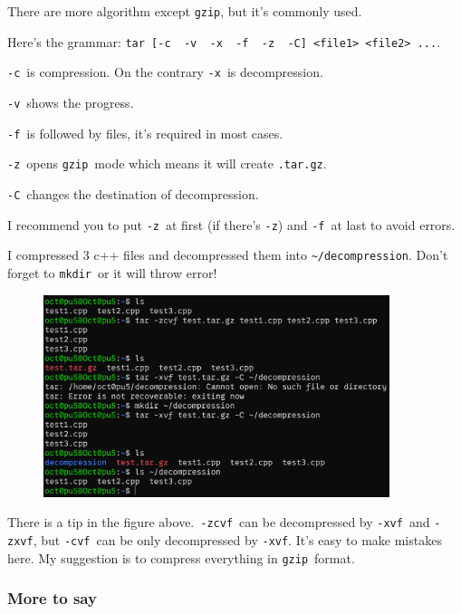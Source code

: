 \documentclass[12pt]{ctexart}
\newenvironment{mdquote}
{%
  \par\noindent
  \begin{list}{}{%
      \setlength{\leftmargin}{1em}%
      \setlength{\rightmargin}{0pt}%
      \setlength{\itemindent}{0pt}%
      \setlength{\listparindent}{\parindent}%
      \setlength{\topsep}{0.5\baselineskip}%
  }
  \item[\textbf{>}\ ]\itshape
}
{\end{list}\par}
\begin{document}
\begin{mdquote}
There are more algorithm except \texttt{gzip}, but it's
commonly used.
\end{mdquote}

Here's the grammar:
\texttt{tar\ {[}-c\ \textbar{}\ -v\ \textbar{}\ -x\ \textbar{}\ -f\ \textbar{}\ -z\ \textbar{}\ -C{]}\ \textless{}file1\textgreater{}\ \textless{}file2\textgreater{}\ ...}.

\texttt{-c}\ is compression. On the contrary \texttt{-x}\ is
decompression.

\texttt{-v}\ shows the progress.

\texttt{-f}\ is followed by files, it's required in most
cases.

\texttt{-z}\ opens \texttt{gzip}\ mode which means it will create
\texttt{.tar.gz}.

\texttt{-C}\ changes the destination of decompression.

I recommend you to put \texttt{-z}\ at first (if there's
\texttt{-z}) and \texttt{-f}\ at last to avoid errors.

I compressed 3 c++ files and decompressed them into
\texttt{\textasciitilde{}/decompression}. Don't forget
to \texttt{mkdir}\ or it will throw error!


\begin{figure}[H]
    \centering
    \includegraphics[width=0.9\textwidth,keepaspectratio]{assets/Linux/1.12 Linux compression commands/1.png}
\end{figure}

There is a tip in the figure above.\ \texttt{-zcvf}\ can be decompressed
by \texttt{-xvf}\ and \texttt{-zxvf}, but \texttt{-cvf}\ can be only
decompressed by \texttt{-xvf}. It's easy to make
mistakes here. My suggestion is to compress everything in \texttt{gzip}\
format.

\subsubsection{\textbf{More to say}}
\end{document}
